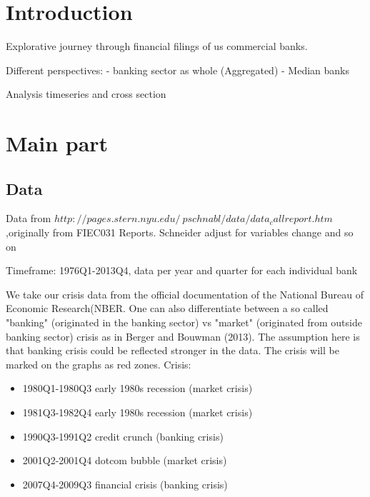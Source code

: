 \documentclass[12pt, a4paper]{article} %
\begin{document}
\tableofcontents
\newpage
{}




\section{Introduction}

Explorative journey through financial filings of us commercial banks.

Different perspectives: 
	- banking sector as whole (Aggregated)
	- Median banks

Analysis timeseries and cross section

\section{Main part}

\subsection{Data}

Data from  $http://pages.stern.nyu.edu/~pschnabl/data/data_callreport.htm$ ,originally from FIEC031 Reports.
Schneider adjust for variables change and so on

Timeframe: 1976Q1-2013Q4, data per year and quarter for each individual bank

We take our crisis data from the official documentation of the National Bureau of Economic Research(NBER. One can also differentiate between a so called "banking" (originated in the banking sector) vs "market" (originated from outside banking sector) crisis as in Berger and Bouwman (2013).  The assumption here is that banking crisis could be reflected stronger in the data. The crisis will be marked on the graphs as red zones.
Crisis:


\begin{itemize}
\item 1980Q1-1980Q3 early 1980s recession (market crisis)
\item 1981Q3-1982Q4 early 1980s recession (market crisis)
\item 1990Q3-1991Q2 credit crunch (banking crisis)
\item 2001Q2-2001Q4 dotcom bubble (market crisis)
\item 2007Q4-2009Q3 financial crisis (banking crisis)
\end{itemize}
\end{document}
